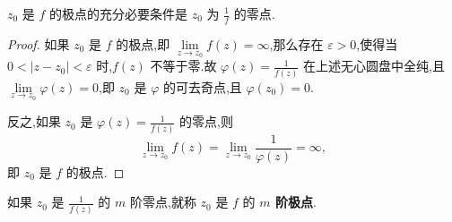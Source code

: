 \documentclass[../../main.tex]{subfiles}
\begin{document}
\begin{proposition}\label{proposition:命题5.2.2}
\( z_0 \) 是 \( f \) 的极点的充分必要条件是 \( z_0 \) 为 \( \frac{1}{f} \) 的零点.
\end{proposition}
\begin{proof}
如果 \( z_0 \) 是 \( f \) 的极点,即 \( \lim\limits_{z \to z_0} f(z) = \infty \),那么存在 \( \varepsilon > 0 \),使得当 \( 0 < |z - z_0| < \varepsilon \) 时,\( f(z) \) 不等于零.故 \( \varphi(z) = \frac{1}{f(z)} \) 在上述无心圆盘中全纯,且 \( \lim\limits_{z \to z_0} \varphi(z) = 0 \),即 \( z_0 \) 是 \( \varphi \) 的可去奇点,且 \( \varphi(z_0) = 0 \).

反之,如果 \( z_0 \) 是 \( \varphi(z) = \frac{1}{f(z)} \) 的零点,则
\[
\lim\limits_{z \to z_0} f(z) = \lim\limits_{z \to z_0} \frac{1}{\varphi(z)} = \infty,
\]
即 \( z_0 \) 是 \( f \) 的极点.
\end{proof}
 
\begin{definition}
如果 \( z_0 \) 是 \( \frac{1}{f(z)} \) 的 \( m \) 阶零点,就称 \( z_0 \) 是 \( f \) 的 \textbf{\( m \) 阶极点}.
\end{definition}
\end{document}
